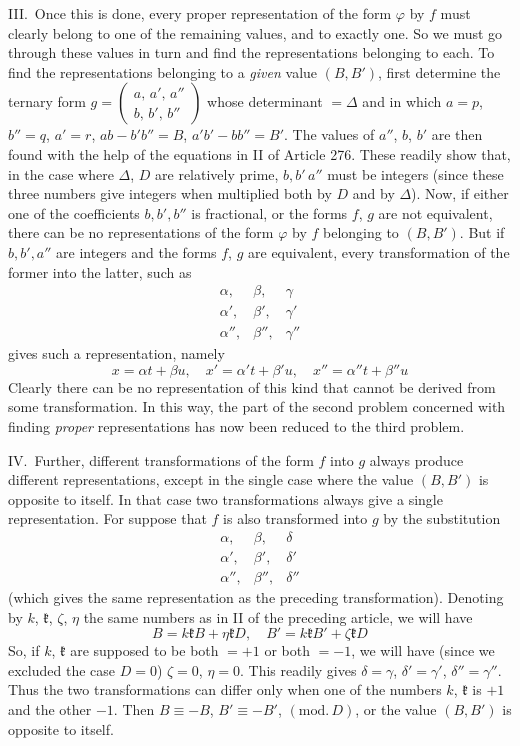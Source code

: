 III.\ Once this is done, every proper representation of the form $\varphi$
by $f$ must clearly belong to one of the remaining values, and to
exactly one. So we must go through these values in turn and find the
representations belonging to each. To find the representations belonging
to a \textit{given} value $(B,B')$, first determine the ternary form $g=\left(\begin{smallmatrix}a,\,a',\,a''\\b,\,b',\,b''\end{smallmatrix}\right)$
whose determinant $=\Delta$ and in which $a=p$, $b''=q$, $a'=r$, $ab-b'b''=B$,
$a'b'-bb''=B'$. The values of $a''$, $b$, $b'$ are then found with the
help of the equations in II of Article 276. These readily show that, in
the case where $\Delta$, $D$ are relatively prime, $b,b'\,a''$ must be
integers (since these three numbers give integers when multiplied both
by $D$ and by $\Delta$). Now, if either one of the coefficients
$b,b',b''$ is fractional, or the forms $f$, $g$ are not equivalent,
there can be no representations of the form $\varphi$ by $f$ belonging
to $(B,B')$. But if $b,b',a''$ are integers and the forms $f$, $g$
are equivalent, every transformation of the former into the latter, such as
\[
\begin{array}{ccc}
\alpha,&\beta,&\gamma\\
\alpha',&\beta',&\gamma'\\
\alpha'',&\beta'',&\gamma''
\end{array}
\]
gives such a representation, namely
\[
x=\alpha t+\beta u,\quad x'=\alpha't+\beta'u,\quad x''=\alpha''t+\beta''u
\]
Clearly there can be no representation of this kind that cannot be
derived from some transformation. In this way, the part of the second
problem concerned with finding \textit{proper} representations has now
been reduced to the third problem.

IV.\ Further, different transformations of the form $f$ into $g$
always produce different representations, except in the single case
where the value $(B,B')$ is opposite to itself. In that case two
transformations always give a single representation. For suppose that
$f$ is also transformed into $g$ by the substitution
\[
\begin{array}{ccc}
\alpha,&\beta,&\delta\\
\alpha',&\beta',&\delta'\\
\alpha'',&\beta'',&\delta''
\end{array}
\]
(which gives the same representation as the preceding transformation).
Denoting by $k$, $\mathfrak{k}$, $\zeta$, $\eta$ the same numbers as in
II of the preceding article, we will have
\[
B=k\mathfrak{k}B+\eta\mathfrak{k}D,\quad B'=k\mathfrak{k}B'+\zeta\mathfrak{k}D
\]
So, if $k$, $\mathfrak{k}$ are supposed to be both $=+1$ or both
$=-1$, we will have (since we excluded the case $D=0$) $\zeta=0$,
$\eta=0$. This readily gives $\delta=\gamma$, $\delta'=\gamma'$, $\delta''=\gamma''$. Thus the two
transformations can differ only when one of the numbers $k$, $\mathfrak{k}$
is $+1$ and the other $-1$. Then $B\equiv-B$, $B'\equiv-B'$, $(\mathrm{mod.}\,D)$,
or the value $(B,B')$ is opposite to itself.

